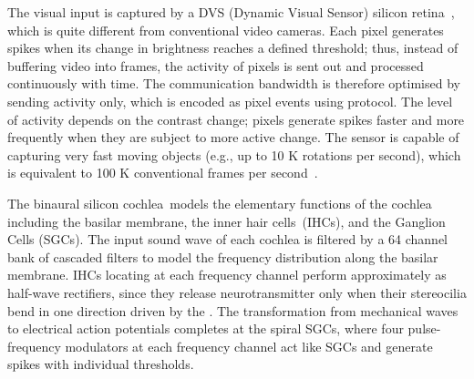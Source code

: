 The visual input is captured by a DVS (Dynamic Visual Sensor) silicon retina~\DIFdelbegin {}\DIFdelend \DIFaddbegin {}\DIFaddend , which is quite different from conventional video cameras.
Each pixel generates spikes when its change in brightness reaches a defined threshold;
thus, instead of buffering video into frames, the activity of pixels is sent out and processed continuously with time.
The communication bandwidth is therefore optimised by sending activity only, which is encoded as pixel events using \DIFdelbegin {}\DIFdelend \DIFaddbegin {}\DIFaddend protocol.
The level of activity depends on the contrast change; pixels generate spikes faster and more frequently when they are subject to more active change.
The sensor is capable of capturing very fast moving objects (e.g., up to 10 K rotations per second), which is equivalent to 100 K conventional frames per second~\DIFdelbegin {}\DIFdelend \DIFaddbegin {}\DIFaddend .

The binaural silicon cochlea~\DIFdelbegin {}\DIFdelend \DIFaddbegin {}\DIFaddend models the elementary functions of the cochlea including the basilar membrane, the inner hair cells~(IHCs), and the \DIFdelbegin {}\DIFdelend \DIFaddbegin {}\DIFaddend Ganglion Cells (SGCs).
The input sound wave of each cochlea is filtered by a 64 channel bank of cascaded filters to model the frequency distribution along the basilar membrane.
IHCs locating at each frequency channel perform approximately as half-wave rectifiers, since they release neurotransmitter only when their stereocilia bend in one direction driven by the \DIFdelbegin {}\DIFdelend \DIFaddbegin {}\DIFaddend .
The transformation from mechanical waves to electrical action potentials completes at the spiral SGCs, where four pulse-frequency modulators at each frequency channel act like SGCs and generate spikes with individual thresholds.


